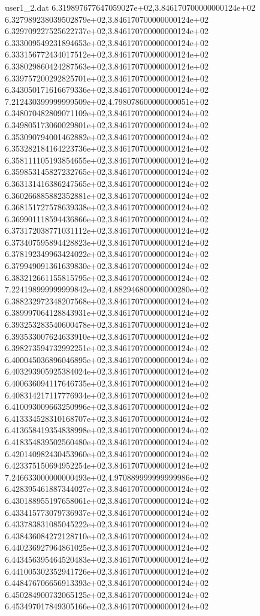 \begin{filecontents}{user1_2.dat}
6.319897677647059027e+02,3.846170700000000124e+02
6.327989238039502879e+02,3.846170700000000124e+02
6.329709227525622737e+02,3.846170700000000124e+02
6.333009549231894653e+02,3.846170700000000124e+02
6.333156772434017512e+02,3.846170700000000124e+02
6.338029860424287563e+02,3.846170700000000124e+02
6.339757200292825701e+02,3.846170700000000124e+02
6.343050171616679336e+02,3.846170700000000124e+02
7.212430399999999509e+02,4.798078600000000051e+02
6.348070482809071109e+02,3.846170700000000124e+02
6.349805173060029801e+02,3.846170700000000124e+02
6.353090794001462882e+02,3.846170700000000124e+02
6.353282184164223736e+02,3.846170700000000124e+02
6.358111105193854655e+02,3.846170700000000124e+02
6.359853145827232765e+02,3.846170700000000124e+02
6.363131416386247565e+02,3.846170700000000124e+02
6.360266885882352881e+02,3.846170700000000124e+02
6.368151727578639338e+02,3.846170700000000124e+02
6.369901118594436866e+02,3.846170700000000124e+02
6.373172038771031112e+02,3.846170700000000124e+02
6.373407595894428823e+02,3.846170700000000124e+02
6.378192349963424022e+02,3.846170700000000124e+02
6.379949091361639830e+02,3.846170700000000124e+02
6.383212661155815795e+02,3.846170700000000124e+02
7.224198999999999842e+02,4.882946800000000280e+02
6.388232972348207568e+02,3.846170700000000124e+02
6.389997064128843931e+02,3.846170700000000124e+02
6.393253283540600478e+02,3.846170700000000124e+02
6.393533007624633910e+02,3.846170700000000124e+02
6.398273594732992251e+02,3.846170700000000124e+02
6.400045036896046895e+02,3.846170700000000124e+02
6.403293905925384024e+02,3.846170700000000124e+02
6.400636094117646735e+02,3.846170700000000124e+02
6.408314217117776934e+02,3.846170700000000124e+02
6.410093009663250996e+02,3.846170700000000124e+02
6.413334528310168707e+02,3.846170700000000124e+02
6.413658419354838998e+02,3.846170700000000124e+02
6.418354839502560480e+02,3.846170700000000124e+02
6.420140982430453960e+02,3.846170700000000124e+02
6.423375150694952254e+02,3.846170700000000124e+02
7.246633000000000493e+02,4.970889999999999986e+02
6.428395461887344027e+02,3.846170700000000124e+02
6.430188955197658061e+02,3.846170700000000124e+02
6.433415773079736937e+02,3.846170700000000124e+02
6.433783831085045222e+02,3.846170700000000124e+02
6.438436084272128710e+02,3.846170700000000124e+02
6.440236927964861025e+02,3.846170700000000124e+02
6.443456395464520483e+02,3.846170700000000124e+02
6.441005302352941726e+02,3.846170700000000124e+02
6.448476706656913393e+02,3.846170700000000124e+02
6.450284900732065125e+02,3.846170700000000124e+02
6.453497017849305166e+02,3.846170700000000124e+02

\end{filecontents}
